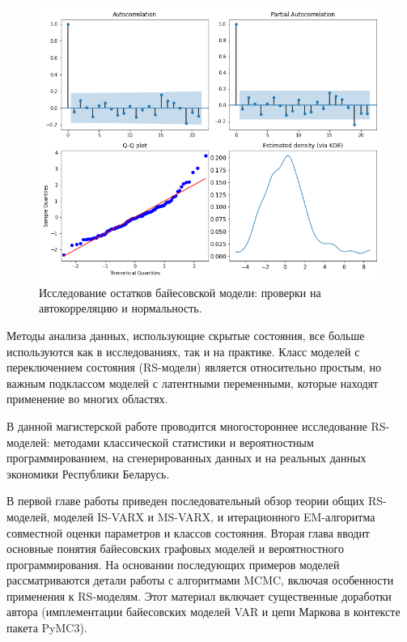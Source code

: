 \documentclass[a4paper,14pt]{extreport}
\begin{document}
\begin{figure}[H]
	\includegraphics[width=\linewidth]{img/gen/pp_ms_arx_resid.png}
	\caption{
		Исследование остатков байесовской модели: 
		проверки на автокорреляцию и нормальность.
	}
	\label{fig:pp_ms_arx_resid}
\end{figure}




Методы анализа данных, использующие скрытые состояния, все больше используются как в исследованиях, так и на практике. Класс моделей с переключением состояния (RS-модели) является относительно простым, но важным подклассом моделей с латентными переменными, которые находят применение во многих областях. 

В данной магистерской работе проводится многостороннее исследование RS-моделей: методами классической статистики и вероятностным программированием, на сгенерированных данных и на реальных данных экономики Республики Беларусь. 

В первой главе работы приведен последовательный обзор теории общих RS-моделей, моделей IS-VARX и MS-VARX, и итерационного EM-алгоритма совместной оценки параметров и классов состояния. Вторая глава вводит основные понятия байесовских графовых моделей и вероятностного программирования. На основании последующих примеров моделей рассматриваются детали работы с алгоритмами MCMC, включая особенности применения к RS-моделям. Этот материал включает существенные доработки автора (имплементации байесовских моделей VAR и цепи Маркова в контексте пакета PyMC3).
\end{document}

